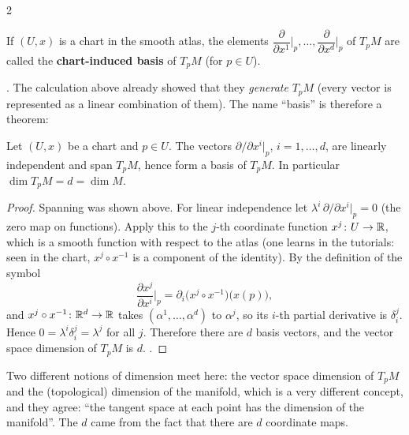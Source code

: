 \begin{paracol}{2}
\begin{definition}\label{def:c05-inducedbasis}
If $(U,x)$ is a chart in the smooth atlas, the elements $\dfrac{\partial}{\partial x^1}\Big|_p,\dots,\dfrac{\partial}{\partial x^d}\Big|_p$ of $T_pM$ are called the \textbf{chart-induced basis} of $T_pM$ (for $p\in U$).
\end{definition}
. The calculation above already showed that they \emph{generate} $T_pM$ (every vector is represented as a linear combination of them). The name ``basis'' is therefore a theorem:
\begin{theorem}\label{thm:c05-basis}
Let $(U,x)$ be a chart and $p\in U$. The vectors $\partial/\partial x^i|_p$, $i=1,\dots,d$, are linearly independent and span $T_pM$, hence form a basis of $T_pM$. In particular $\dim T_pM=d=\dim M$.
\end{theorem}
\begin{proof}
Spanning was shown above. For linear independence let $\lambda^i\,\partial/\partial x^i|_p=0$ (the zero map on functions). Apply this to the $j$-th coordinate function $x^j\colon U\to\mathbb{R}$, which is a smooth function with respect to the atlas (one learns in the tutorials: seen in the chart, $x^j\circ x^{-1}$ is a component of the identity). By the definition of the symbol
\[
  \frac{\partial x^j}{\partial x^i}\Big|_p=\partial_i\bigl(x^j\circ x^{-1}\bigr)\bigl(x(p)\bigr),
\]
and $x^j\circ x^{-1}\colon\mathbb{R}^d\to\mathbb{R}$ takes $(\alpha^1,\dots,\alpha^d)$ to $\alpha^j$, so its $i$-th partial derivative is $\delta^j_i$. Hence $0=\lambda^i\delta^j_i=\lambda^j$ for all $j$. Therefore there are $d$ basis vectors, and the vector space dimension of $T_pM$ is $d$.
.
\end{proof}
Two different notions of dimension meet here: the vector space dimension of $T_pM$ and the (topological) dimension of the manifold, which is a very different concept, and they agree: ``the tangent space at each point has the dimension of the manifold''. The $d$ came from the fact that there are $d$ coordinate maps.


\end{paracol}
